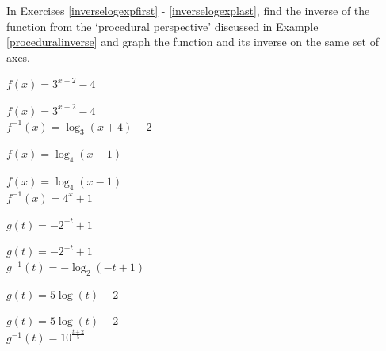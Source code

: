 \documentclass{ximera}
\begin{document}
\begin{question}
In Exercises \ref{inverselogexpfirst} - \ref{inverselogexplast},  find the inverse of the function from the `procedural perspective' discussed in Example \ref{proceduralinverse} and graph the function and its inverse on the same set of axes.

\begin{problem}\label{inverselogexpfirst}
$f(x) = 3^{x + 2} - 4$

\begin{solution}
$f(x) = 3^{x + 2} - 4$\\
$f^{-1}(x) = \log_{3}(x + 4) - 2$\\

\begin{center} 
\end{center}

\end{solution}
\end{problem}

\begin{problem}
$f(x) = \log_{4}(x - 1)$

\begin{solution}
    $f(x) = \log_{4}(x - 1)$\\
$f^{-1}(x) = 4^{x} + 1$\\

\begin{center} 
\end{center}

\end{solution}
\end{problem}

\begin{problem}
$g(t)= -2^{-t} + 1$

\begin{solution}
    $g(t) = -2^{-t} + 1$\\
$g^{-1}(t) = -\log_{2}(-t+1)$ \\

\begin{center} 
\end{center}

\end{solution}
\end{problem}

\begin{problem}\label{inverselogexplast}
$g(t) = 5\log(t) - 2$ 

\begin{solution}
    $g(t) = 5\log(t) - 2$\\
$g^{-1}(t) = 10^{\frac{t + 2}{5}}$\\

\begin{center} 
\end{center}

\end{solution}
\end{problem}

\end{question}
\end{document}
